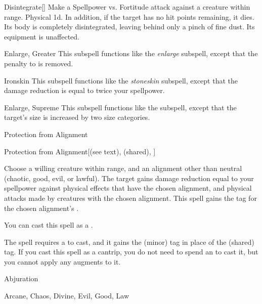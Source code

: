 \begin{ability}[\nth{6}]{Disintegrate}[]
Make a Spellpower vs. Fortitude attack against a creature within \rngmed range.
\hit Physical  \plus1d.
In addition, if the target has no hit points remaining, it dies.
Its body is completely disintegrated, leaving behind only a pinch of fine dust.
Its equipment is unaffected.
\end{ability}
\vspace{0.25em}


\begin{ability}[\nth{6}]{Enlarge, Greater}
This subspell functions like the \textit{enlarge} subspell, except that the penalty to  is removed.
\end{ability}
\vspace{0.25em}


\begin{ability}[\nth{7}]{Ironskin}
This subspell functions like the \textit{stoneskin} subspell, except that the damage reduction is equal to twice your spellpower.
\end{ability}
\vspace{0.25em}


\begin{ability}[\nth{9}]{Enlarge, Supreme}
This subspell functions like the  subspell, except that the target's size is increased by two size categories.
\end{ability}
\vspace{0.25em}

\newpage
\begin{spellsection}{Protection from Alignment}


\begin{ability}{Protection from Alignment}[(see text),  (shared), ]

Choose a willing creature within \rngclose range, and an alignment other than neutral (chaotic, good, evil, or lawful).
The target gains damage reduction equal to your spellpower against physical effects that have the chosen alignment, and physical attacks made by creatures with the chosen alignment.
This spell gains the tag for the chosen alignment's .

You can cast this spell as a .

\end{ability}



 The spell requires a  to cast, and it gains the  (minor) tag in place of the  (shared) tag. If you cast this spell as a cantrip,
you do not need to spend an  to cast it,
but you cannot apply any augments to it.


 Abjuration

 Arcane, Chaos, Divine, Evil, Good, Law
\end{spellsection}


